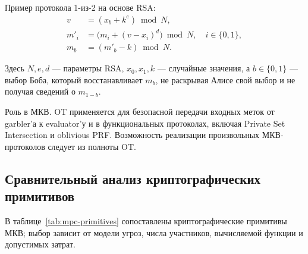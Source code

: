 Пример протокола 1-из-2 на основе RSA:
\begin{equation}
\begin{aligned}
v &= (x_b + k^e)\bmod N, \\
m'_i &= \bigl(m_i + (v-x_i)^d\bigr)\bmod N, \quad i\in\{0,1\}, \\
m_b &= (m'_b-k)\bmod N.
\end{aligned}
\end{equation}

Здесь \(N,e,d\) --- параметры RSA, \(x_0,x_1,k\) --- случайные значения, а \(b\in\{0,1\}\) --- выбор Боба, который восстанавливает \(m_b\), не раскрывая Алисе свой выбор и не получая сведений о \(m_{1-b}\).

Роль в МКВ. OT применяется для безопасной передачи входных меток от garbler’а к evaluator’у и в функциональных протоколах, включая Private Set Intersection и oblivious PRF. Возможность реализации произвольных МКВ-протоколов следует из полноты OT.

\subsection{Сравнительный анализ криптографических примитивов}

В таблице~\ref{tab:mpc-primitives} сопоставлены криптографические примитивы МКВ; выбор зависит от модели угроз, числа участников, вычисляемой функции и допустимых затрат.

